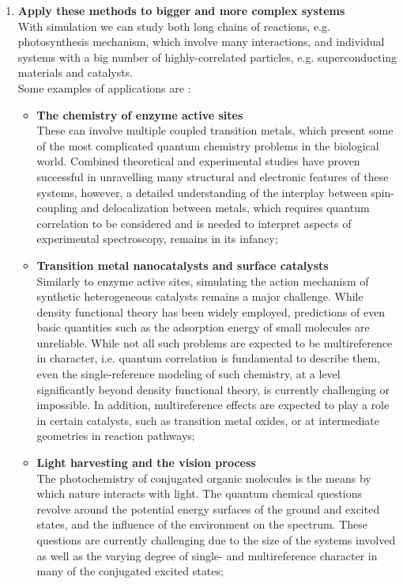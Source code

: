 \begin{enumerate}
  \item \textbf{Apply these methods to bigger and more complex systems} \\
  With simulation we can study both long chains of reactions, e.g. photosynthesis mechanism, which involve many interactions, and individual systems with a big number of highly-correlated particles, e.g. superconducting materials and catalysts. \\
  Some examples of applications are \cite{Bauer2020Nov}:
  \begin{itemize}
      \item \textbf{The chemistry of enzyme active sites} \\
      These can involve multiple coupled transition metals, which present some of the most complicated quantum chemistry problems in the biological world. Combined theoretical and experimental studies have proven successful in unravelling many structural and electronic features of these systems, however, a detailed understanding of the interplay between spin-coupling and delocalization between metals, which requires quantum correlation to be considered and is needed to interpret aspects of experimental spectroscopy, remains in its infancy;
      
      \item \textbf{Transition metal nanocatalysts and surface catalysts} \\
      Similarly to enzyme active sites, simulating the action mechanism of synthetic heterogeneous catalysts remains a major challenge. While density functional theory has been widely employed, predictions of even basic quantities such as the adsorption energy of small molecules are unreliable. While not all such problems are expected to be multireference in character, i.e. quantum correlation is fundamental to describe them, even the single-reference modeling of such chemistry, at a level significantly beyond density functional theory, is currently challenging or impossible. In addition, multireference effects are expected to play a role in certain catalysts, such as transition metal oxides, or at intermediate geometries in reaction pathways;
      
      \item \textbf{Light harvesting and the vision process} \\
      The photochemistry of conjugated organic molecules is the means by which nature interacts with light. The quantum chemical questions revolve around the potential energy surfaces of the ground and excited states, and the influence of the environment on the spectrum. These questions are currently challenging due to the size of the systems involved as well as the varying degree of single- and multireference character in many of the conjugated excited states;
      

\end{itemize}
\end{enumerate}
